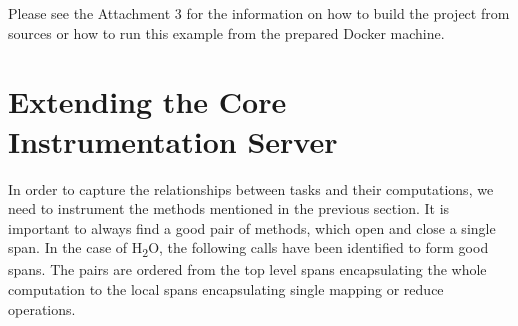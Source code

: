 Please see the Attachment 3 for the information on how to build the project from sources or how to run this example from the prepared Docker machine. 

\section{Extending the Core Instrumentation Server}
In order to capture the relationships between tasks and their computations, we need to instrument the methods mentioned in the previous section. It is important to always find a good pair of methods, which open and close a single span. In the case of H\textsubscript{2}O, the following calls have been identified to form good spans. The pairs are ordered from the top level spans encapsulating the whole computation to the local spans encapsulating single mapping or reduce operations.

